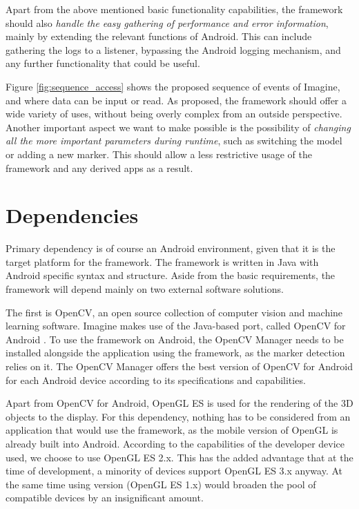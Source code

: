 Apart from the above mentioned basic functionality capabilities, the framework should also \textit{handle the easy gathering of performance and error information}, mainly by extending the relevant functions of Android.
This can include gathering the logs to a listener, bypassing the Android logging mechanism, and any further functionality that could be useful.

Figure \ref{fig:sequence_access} shows the proposed sequence of events of Imagine, and where data can be input or read.
As proposed, the framework should offer a wide variety of uses, without being overly complex from an outside perspective.
Another important aspect we want to make possible is the possibility of \textit{changing all the more important parameters during runtime}, such as switching the model or adding a new marker.
This should allow a less restrictive usage of the framework and any derived apps as a result.

\section{Dependencies}

Primary dependency is of course an Android environment, given that it is the target platform for the framework.
The framework is written in Java with Android specific syntax and structure.
Aside from the basic requirements, the framework will depend mainly on two external software solutions.

The first is OpenCV, an open source collection of computer vision and machine learning software.
Imagine makes use of the Java-based port, called OpenCV for Android \cite{opencvandroid}.
To use the framework on Android, the OpenCV Manager \cite{opencvmanager} needs to be installed alongside the application using the framework, as the marker detection relies on it.
The OpenCV Manager offers the best version of OpenCV for Android for each Android device according to its specifications and capabilities.

Apart from OpenCV for Android, OpenGL ES is used for the rendering of the 3D objects to the display.
For this dependency, nothing has to be considered from an application that would use the framework, as the mobile version of OpenGL is already built into Android.
According to the capabilities of the developer device used, we choose to use OpenGL ES 2.x.
This has the added advantage that at the time of development, a minority of devices support OpenGL ES 3.x anyway.
At the same time using version (OpenGL ES 1.x) would broaden the pool of compatible devices by an insignificant amount.

